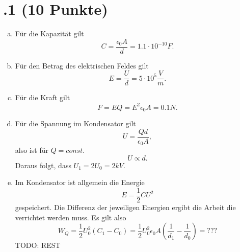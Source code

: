 \section*{\nr.1 \titone (10 Punkte)}
\begin{enumerate}[(a)]
\item Für die Kapazität gilt
\begin{equation}
  C=\frac{\epsilon_0A}{d}=1.1\cdot 10^{-10}F.
\end{equation}
\item Für den Betrag des elektrischen Feldes gilt
\begin{equation}
  E=\frac{U}{d}=5\cdot 10^5 \frac{V}{m}.
\end{equation}
\item Für die Kraft gilt
\begin{equation}
  F=EQ=E^2\epsilon_0A=0.1N.
\end{equation}
\item Für die Spannung im Kondensator gilt
\begin{equation}
  U=\frac{Qd}{\epsilon_0A},
\end{equation}
also ist für $Q=const.$
\begin{equation}
  U\propto d.
\end{equation}
Daraus folgt, dass $U_1=2U_0=2kV$.
\item Im Kondensator ist allgemein die Energie 
\begin{equation}
  E=\frac{1}{2}CU^2
\end{equation}
gespeichert. 
Die Differenz der jeweiligen Energien ergibt die Arbeit die verrichtet werden muss. Es gilt also
\begin{equation}
  W_Q=\frac{1}{2}U_0^2(C_1-C_0)=\frac{1}{2}U_0^2\epsilon_0A\left(\frac{1}{d_1}-\frac{1}{d_0}\right)=???
\end{equation}
TODO: REST
\end{enumerate}